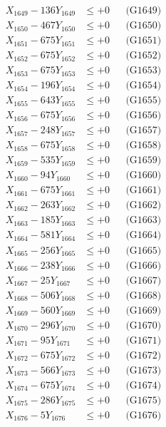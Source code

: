 \documentclass[a4paper,10pt]{article}
\begin{document}
{\begin{align}
X_{1649} - 136Y_{1649} &\leq +0 && \text{(G1649)} \\
X_{1650} - 467Y_{1650} &\leq +0 && \text{(G1650)} \\
\allowbreak
X_{1651} - 675Y_{1651} &\leq +0 && \text{(G1651)} \\
X_{1652} - 675Y_{1652} &\leq +0 && \text{(G1652)} \\
X_{1653} - 675Y_{1653} &\leq +0 && \text{(G1653)} \\
X_{1654} - 196Y_{1654} &\leq +0 && \text{(G1654)} \\
X_{1655} - 643Y_{1655} &\leq +0 && \text{(G1655)} \\
X_{1656} - 675Y_{1656} &\leq +0 && \text{(G1656)} \\
X_{1657} - 248Y_{1657} &\leq +0 && \text{(G1657)} \\
X_{1658} - 675Y_{1658} &\leq +0 && \text{(G1658)} \\
X_{1659} - 535Y_{1659} &\leq +0 && \text{(G1659)} \\
X_{1660} - 94Y_{1660} &\leq +0 && \text{(G1660)} \\
\allowbreak
X_{1661} - 675Y_{1661} &\leq +0 && \text{(G1661)} \\
X_{1662} - 263Y_{1662} &\leq +0 && \text{(G1662)} \\
X_{1663} - 185Y_{1663} &\leq +0 && \text{(G1663)} \\
X_{1664} - 581Y_{1664} &\leq +0 && \text{(G1664)} \\
X_{1665} - 256Y_{1665} &\leq +0 && \text{(G1665)} \\
X_{1666} - 238Y_{1666} &\leq +0 && \text{(G1666)} \\
X_{1667} - 25Y_{1667} &\leq +0 && \text{(G1667)} \\
X_{1668} - 506Y_{1668} &\leq +0 && \text{(G1668)} \\
X_{1669} - 560Y_{1669} &\leq +0 && \text{(G1669)} \\
X_{1670} - 296Y_{1670} &\leq +0 && \text{(G1670)} \\
\allowbreak
X_{1671} - 95Y_{1671} &\leq +0 && \text{(G1671)} \\
X_{1672} - 675Y_{1672} &\leq +0 && \text{(G1672)} \\
X_{1673} - 566Y_{1673} &\leq +0 && \text{(G1673)} \\
X_{1674} - 675Y_{1674} &\leq +0 && \text{(G1674)} \\
X_{1675} - 286Y_{1675} &\leq +0 && \text{(G1675)} \\
X_{1676} - 5Y_{1676} &\leq +0 && \text{(G1676)} \\

\end{align}}
\end{document}
